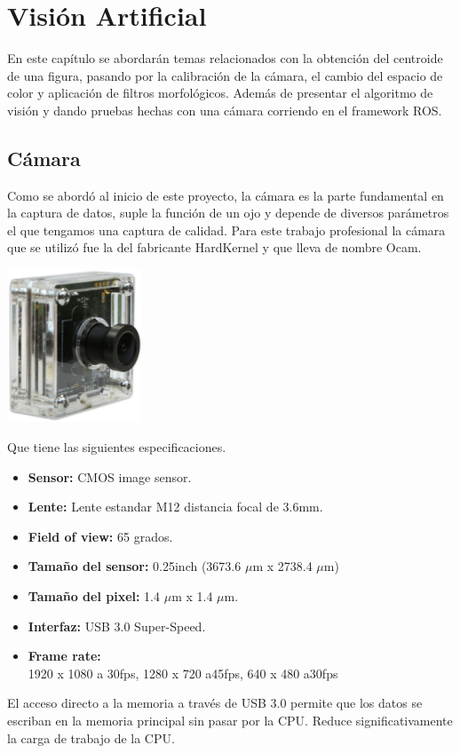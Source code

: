 \chapter{Visión Artificial}

En este capítulo se abordarán temas relacionados con la obtención del centroide de una figura, pasando por la calibración de la
cámara, el cambio del espacio de color y aplicación de filtros morfológicos. Además de presentar el algoritmo de visión y
dando pruebas hechas con una cámara corriendo en el framework ROS.

\section{Cámara}
Como se abordó al inicio de este proyecto, la cámara es la parte fundamental en
la captura de datos, suple la función de un ojo y depende de diversos
parámetros el que tengamos una captura de calidad. Para este trabajo profesional
la cámara que se utilizó fue la del fabricante HardKernel y que lleva de nombre
Ocam.
\begin{center}
	\includegraphics[width=0.3\textwidth]{Contenido/Cuerpo/Capitulo4/Fig0_1.eps}
	\label{Fig1}
\end{center}
Que tiene las siguientes especificaciones.
\begin{itemize}
	\item \textbf{Sensor:} CMOS image sensor.
	\item \textbf{Lente: } Lente estandar M12 distancia focal de 3.6mm.
	\item \textbf{Field of view: } 65 grados.
	\item \textbf{Tamaño del sensor: }0.25inch (3673.6 $\mu$m x 2738.4 $\mu$m)
	\item \textbf{Tamaño del pixel: } 1.4 $\mu$m x 1.4 $\mu$m.
	\item \textbf{Interfaz: }USB 3.0 Super-Speed.
	\item \textbf{Frame rate: }\\
	      1920 x 1080 a 30fps, 1280 x 720 a45fps, 640 x 480 a30fps
\end{itemize}
El acceso directo a la memoria a través de USB 3.0 permite que los datos se
escriban en la memoria principal sin pasar por la CPU. Reduce significativamente
la carga de trabajo de la CPU.

